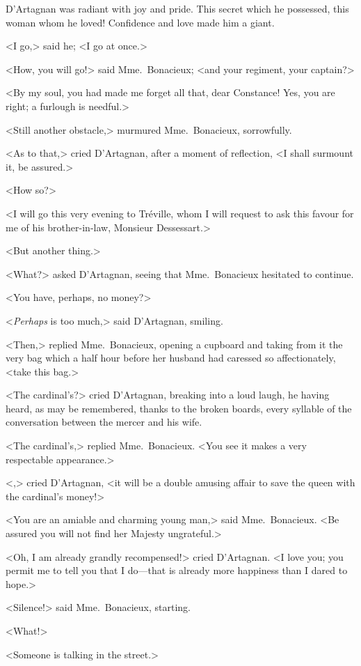 D'Artagnan was radiant with joy and pride. This secret which he possessed, this woman whom he loved! Confidence and love made him a giant. 

<I go,> said he; <I go at once.> 

<How, you will go!> said Mme.~Bonacieux; <and your regiment, your captain?> 

<By my soul, you had made me forget all that, dear Constance! Yes, you are right; a furlough is needful.> 

<Still another obstacle,> murmured Mme.~Bonacieux, sorrowfully. 

<As to that,> cried D'Artagnan, after a moment of reflection, <I shall surmount it, be assured.> 

<How so?> 

<I will go this very evening to Tréville, whom I will request to ask this favour for me of his brother-in-law, Monsieur Dessessart.> 

<But another thing.> 

<What?> asked D'Artagnan, seeing that Mme.~Bonacieux hesitated to continue. 

<You have, perhaps, no money?> 

<\emph{Perhaps} is too much,> said D'Artagnan, smiling. 

<Then,> replied Mme.~Bonacieux, opening a cupboard and taking from it the very bag which a half hour before her husband had caressed so affectionately, <take this bag.> 

<The cardinal's?> cried D'Artagnan, breaking into a loud laugh, he having heard, as may be remembered, thanks to the broken boards, every syllable of the conversation between the mercer and his wife. 

<The cardinal's,> replied Mme.~Bonacieux. <You see it makes a very respectable appearance.> 

<,> cried D'Artagnan, <it will be a double amusing affair to save the queen with the cardinal's money!> 

<You are an amiable and charming young man,> said Mme.~Bonacieux. <Be assured you will not find her Majesty ungrateful.> 

<Oh, I am already grandly recompensed!> cried D'Artagnan. <I love you; you permit me to tell you that I do—that is already more happiness than I dared to hope.> 

<Silence!> said Mme.~Bonacieux, starting. 

<What!> 

<Someone is talking in the street.> 

